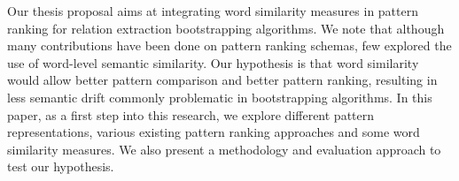 Our thesis proposal aims at integrating word similarity measures in pattern ranking for relation extraction bootstrapping algorithms. We note that although many contributions have been done on pattern ranking schemas, few explored the use of word-level semantic similarity. Our hypothesis is that word similarity would allow better pattern comparison and better pattern ranking, resulting in less semantic drift commonly problematic in bootstrapping algorithms. In this paper, as a first step into this research, we explore different pattern representations, various existing pattern ranking approaches and some word similarity measures. We also present a methodology and evaluation approach to test our hypothesis.
